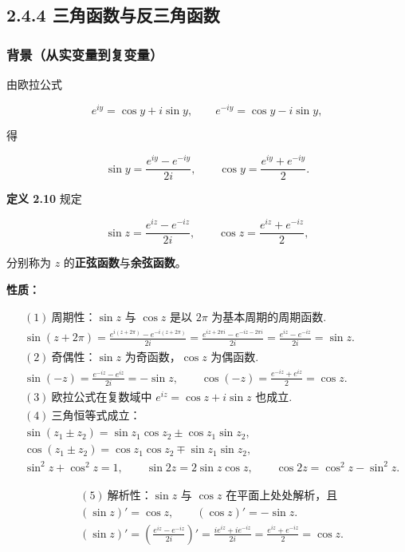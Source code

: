 \subsection{2.4.4
三角函数与反三角函数}\label{ux4e09ux89d2ux51fdux6570ux4e0eux53cdux4e09ux89d2ux51fdux6570}

\subsubsection{背景（从实变量到复变量）}\label{ux80ccux666fux4eceux5b9eux53d8ux91cfux5230ux590dux53d8ux91cf}

由欧拉公式

\[
e^{iy}=\cos y+i\sin y,\qquad e^{-iy}=\cos y-i\sin y,
\]

得

\[
\sin y=\frac{e^{iy}-e^{-iy}}{2i},\qquad \cos y=\frac{e^{iy}+e^{-iy}}{2}.
\]

\textbf{定义 2.10} 规定

\[
\sin z=\frac{e^{iz}-e^{-iz}}{2i},\qquad \cos z=\frac{e^{iz}+e^{-iz}}{2},
\]

分别称为 \(z\) 的\textbf{正弦函数}与\textbf{余弦函数}。

\textbf{性质：}

\[
\begin{aligned}
&(1)\ \text{周期性：}\sin z\text{ 与 }\cos z\text{ 是以 }2\pi\text{ 为基本周期的周期函数}.\\
&\sin(z+2\pi)=\frac{e^{i(z+2\pi)}-e^{-i(z+2\pi)}}{2i}
=\frac{e^{iz+2\pi i}-e^{-iz-2\pi i}}{2i}
=\frac{e^{iz}-e^{-iz}}{2i}=\sin z.\\
&(2)\ \text{奇偶性：}\sin z\text{ 为奇函数，}\cos z\text{ 为偶函数}.\\
&\sin(-z)=\frac{e^{-iz}-e^{iz}}{2i}=-\sin z,\qquad
\cos(-z)=\frac{e^{-iz}+e^{iz}}{2}=\cos z.\\
&(3)\ \text{欧拉公式在复数域中 }e^{iz}=\cos z+i\sin z\text{ 也成立}.\\
&(4)\ \text{三角恒等式成立：}\\
&\sin(z_1\pm z_2)=\sin z_1\cos z_2\pm\cos z_1\sin z_2,\\
&\cos(z_1\pm z_2)=\cos z_1\cos z_2\mp\sin z_1\sin z_2,\\
&\sin^2 z+\cos^2 z=1,\qquad \sin 2z=2\sin z\cos z,\qquad
\cos 2z=\cos^2 z-\sin^2 z.
\end{aligned}
\]

\[
\begin{aligned}
&(5)\ \text{解析性：}\sin z\text{ 与 }\cos z\text{ 在平面上处处解析，且}\\
&(\sin z)'=\cos z,\qquad (\cos z)'=-\sin z.\\
&(\sin z)'=\left(\frac{e^{iz}-e^{-iz}}{2i}\right)'
=\frac{ie^{iz}+ie^{-iz}}{2i}
=\frac{e^{iz}+e^{-iz}}{2}=\cos z.
\end{aligned}
\]

